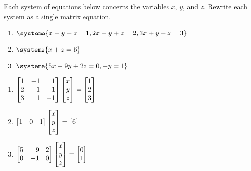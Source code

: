 \begin{exercises}
	\begin{problist}

		\prob Each system of equations below concerns the variables $x$, $y$, and $z$.
		Rewrite each system as a single matrix equation.
		\begin{enumerate}
			\item $\systeme{
											x-y+z=1,
											2x-y+z=2,
											3x+y-z=3
										}$
			\item $\systeme{
											x+z=6
										}$
			\item $\systeme{
											5x-9y+2z=0,
											-y=1
										}$
		\end{enumerate}
		\begin{solution}
			\begin{enumerate}
				\item $\mat{1&-1&1\\2&-1&1\\3&1&-1}\mat{x\\y\\z} = \mat{1\\2\\3}$
				\item $\mat{1&0&1}\mat{x\\y\\z} = \mat{6}$
				\item $\mat{5&-9&2\\0&-1&0}\mat{x\\y\\z} = \mat{0\\1}$
			\end{enumerate}
		\end{solution}


\end{problist}
\end{exercises}
